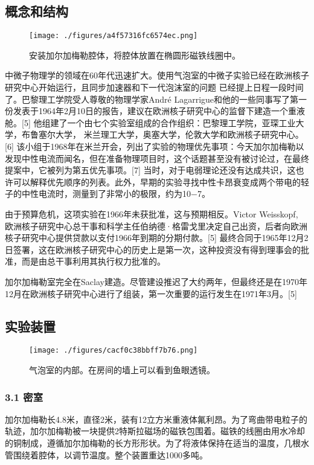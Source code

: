 \subsection{概念和结构}
\begin{figure}[ht]
\centering
\texttt{[image: ./figures/a4f57316fc6574ec.png]}
\caption{安装加尔加梅勒腔体，将腔体放置在椭圆形磁铁线圈中。} \label{fig_JRJML_2}
\end{figure}
中微子物理学的领域在60年代迅速扩大。使用气泡室的中微子实验已经在欧洲核子研究中心开始运行，且同步加速器和下一代泡沫室的问题 已经提上日程一段时间了。巴黎理工学院受人尊敬的物理学家André Lagarrigue和他的一些同事写了第一份发表于1964年2月10日的报告，建议在欧洲核子研究中心的监督下建造一个重液舱。[5] 他组建了一个由七个实验室组成的合作组织：巴黎理工学院，亚琛工业大学，布鲁塞尔大学， 米兰理工大学，奥塞大学，伦敦大学和欧洲核子研究中心。[6] 该小组于1968年在米兰开会，列出了实验的物理优先事项：今天加尔加梅勒以发现中性电流而闻名，但在准备物理项目时，这个话题甚至没有被讨论过，在最终提案中，它被列为第五优先事项。[7] 当时，对于电弱理论还没有达成共识，这也许可以解释优先顺序的列表。此外，早期的实验寻找中性卡昂衰变成两个带电的轻子的中性电流时，测量到了非常小的极限，约为10−7。

由于预算危机，这项实验在1966年未获批准，这与预期相反。Victor Weisskopf, 欧洲核子研究中心总干事和科学主任伯纳德·格雷戈里决定自己出资，后者向欧洲核子研究中心提供贷款以支付1966年到期的分期付款。[5] 最终合同于1965年12月2日签署，这在欧洲核子研究中心的历史上是第一次，这种投资没有得到理事会的批准，而是由总干事利用其执行权力批准的。

加尔加梅勒室完全在Saclay建造。尽管建设推迟了大约两年，但最终还是在1970年12月在欧洲核子研究中心进行了组装，第一次重要的运行发生在1971年3月。[5]

\subsection{实验装置}
\begin{figure}[ht]
\centering
\texttt{[image: ./figures/cacf0c38bbff7b76.png]}
\caption{气泡室的内部。在房间的墙上可以看到鱼眼透镜。} \label{fig_JRJML_3}
\end{figure}
\subsubsection{3.1 密室}
加尔加梅勒长4.8米，直径2米，装有12立方米重液体氟利昂。为了弯曲带电粒子的轨迹，加尔加梅勒被一块提供2特斯拉磁场的磁铁包围着。磁铁的线圈由用水冷却的铜制成，遵循加尔加梅勒的长方形形状。为了将液体保持在适当的温度，几根水管围绕着腔体，以调节温度。整个装置重达1000多吨。

